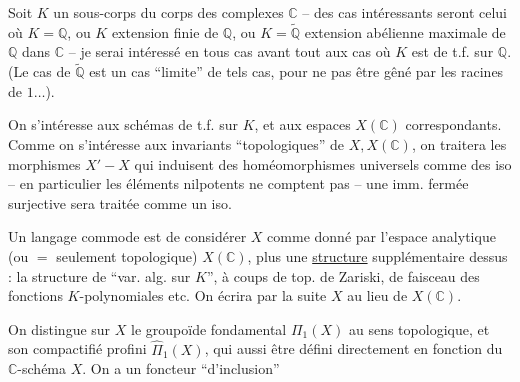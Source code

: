 Soit $K$ un sous-corps du corps des complexes $\mathbb C$ -- des cas intéressants seront celui où $K=\mathbb Q$, ou $K$ extension finie de $\mathbb Q$, ou $K=\widetilde{\mathbb Q}$ extension abélienne maximale de $\mathbb Q$ dans $\mathbb C$ -- je serai intéressé en tous cas avant tout aux cas où $K$ est de t.f. sur $\mathbb Q$. (Le cas de $\widetilde{\mathbb Q}$ est un cas ``limite'' de tels cas, pour ne pas être gêné par les racines de $1\ldots$).

On s'intéresse aux schémas  de t.f. sur $K$, et aux espaces  $X(\mathbb C)$ correspondants. Comme on s'intéresse aux invariants ``topologiques'' de $X,X(\mathbb C)$, on traitera les morphismes $X'-X$ qui induisent des homéomorphismes universels comme des iso -- en particulier les éléments nilpotents ne comptent pas -- une imm. fermée surjective sera traitée comme un iso.

Un langage commode est de considérer $X$ comme donné par l'espace analytique (ou $=$ seulement topologique) $X(\mathbb C)$, plus une \uline{structure} supplémentaire dessus : la structure de ``var. alg. sur $K$'', à coups de top. de Zariski, de faisceau des fonctions $K$-polynomiales etc. On écrira par la suite $X$ au lieu de $X(\mathbb C)$.

On distingue sur $X$ le groupoïde fondamental $\Pi_1(X)$ au sens topologique, et son compactifié profini $\widehat\Pi_1(X)$, qui   aussi être défini directement en fonction du $\mathbb C$-schéma $X$. On a un foncteur ``d'inclusion''
